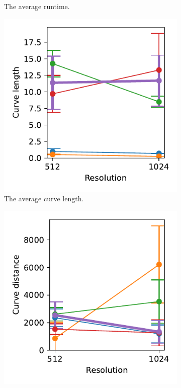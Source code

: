 \begin{figure}[!h]
\begin{subfigure}{.3\textwidth}
    \caption{The average runtime.}
\end{subfigure}
    \begin{subfigure}{.3\textwidth}
    \centering
    \includegraphics[width=\textwidth]{graphics/eval/curve length_res_sketchbench.pdf}
    \caption{The average curve length.}
\end{subfigure}
    \begin{subfigure}{.3\textwidth}
    \centering
    \includegraphics[width=\textwidth]{graphics/eval/curve distance_res_sketchbench.pdf}

\end{subfigure}
\end{figure}
